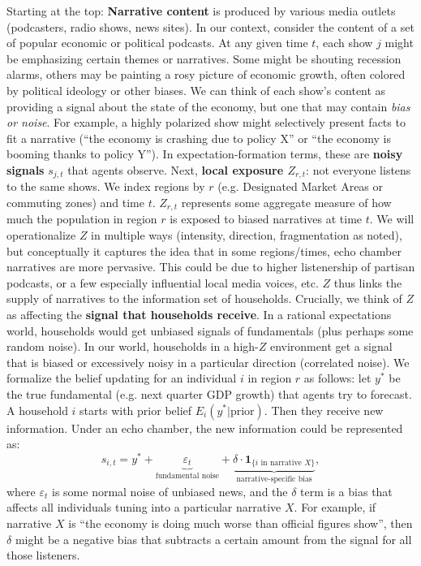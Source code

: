 \documentclass[12pt]{article}
\begin{document}
Starting at the top: \textbf{Narrative content} is produced by various media outlets (podcasters, radio shows, news sites). In our context, consider the content of a set of popular economic or political podcasts. At any given time $t$, each show $j$ might be emphasizing certain themes or narratives. Some might be shouting recession alarms, others may be painting a rosy picture of economic growth, often colored by political ideology or other biases. We can think of each show's content as providing a signal about the state of the economy, but one that may contain \textit{bias or noise}. For example, a highly polarized show might selectively present facts to fit a narrative (“the economy is crashing due to policy X” or “the economy is booming thanks to policy Y”). In expectation-formation terms, these are \textbf{noisy signals} $s_{j,t}$ that agents observe.
Next, \textbf{local exposure $Z_{r,t}$}: not everyone listens to the same shows. We index regions by $r$ (e.g. Designated Market Areas or commuting zones) and time $t$. $Z_{r,t}$ represents some aggregate measure of how much the population in region $r$ is exposed to biased narratives at time $t$. We will operationalize $Z$ in multiple ways (intensity, direction, fragmentation as noted), but conceptually it captures the idea that in some regions/times, echo chamber narratives are more pervasive. This could be due to higher listenership of partisan podcasts, or a few especially influential local media voices, etc. $Z$ thus links the supply of narratives to the information set of households.
Crucially, we think of $Z$ as affecting the \textbf{signal that households receive}. In a rational expectations world, households would get unbiased signals of fundamentals (plus perhaps some random noise). In our world, households in a high-$Z$ environment get a signal that is biased or excessively noisy in a particular direction (correlated noise). We formalize the belief updating for an individual $i$ in region $r$ as follows: let $y^*$ be the true fundamental (e.g. next quarter GDP growth) that agents try to forecast. A household $i$ starts with prior belief $E_{i}(y^*| \text{prior})$. Then they receive new information. Under an echo chamber, the new information could be represented as:
\[
    s_{i,t} = y^* + \underbrace{\varepsilon_{t}}_{\text{fundamental noise}} + \underbrace{\delta \cdot \mathbf{1}_{\{ i \text{ in narrative } X \}}}_{\text{narrative-specific bias}},
\]
where $\varepsilon_t$ is some normal noise of unbiased news, and the $\delta$ term is a bias that affects all individuals tuning into a particular narrative $X$. For example, if narrative $X$ is ``the economy is doing much worse than official figures show'', then $\delta$ might be a negative bias that subtracts a certain amount from the signal for all those listeners.
\end{document}
